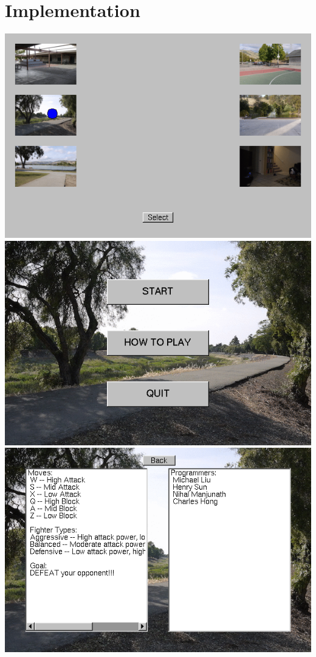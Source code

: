 \documentclass{article}
\begin{document}
\section*{Implementation}
\includegraphics[scale=0.5]{test1.png}
\clearpage
\includegraphics[scale=0.5]{test2.png}
\clearpage
\includegraphics[scale=0.5]{test3.png}
\end{document}
